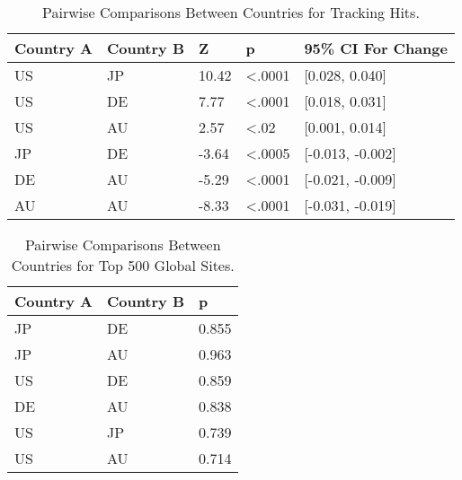 \documentclass[conference]{IEEEtran}
\begin{document}
\begin{table}[t]	
\centering
\caption{Pairwise Comparisons Between Countries for Tracking Hits.}
\label{pairwise}
\begin{tabular}{|l|l|l|l|l|}
   \hline
\textbf{Country A} & \textbf{Country B} & \textbf{Z}     & \textbf{p}              & 9\textbf{5\% CI For Change}   \\    \hline
US        & JP        & 10.42 & \textless.0001 & {[}0.028, 0.040{]}   \\   \hline
US        & DE        & 7.77  & \textless.0001 & {[}0.018, 0.031{]}   \\   \hline
US        & AU        & 2.57  & \textless.02   & {[}0.001, 0.014{]}   \\   \hline
JP        & DE        & -3.64 & \textless.0005 & {[}-0.013, -0.002{]} \\   \hline
DE        & AU        & -5.29 & \textless.0001 & {[}-0.021, -0.009{]} \\   \hline
AU        & AU        & -8.33 & \textless.0001 & {[}-0.031, -0.019{]}\\   \hline
\end{tabular}
\end{table}

\begin{table}[t]
\centering
\caption{Pairwise Comparisons Between Countries for Top 500 Global Sites.}
\label{pairwise500}
\begin{tabular}{|l|l|l|}
\hline
\textbf{Country A} & \textbf{Country B}  & \textbf{p} \\ \hline
JP                            & DE                            & 0.855                         \\ \hline
JP                            & AU                            & 0.963\\ \hline
US                            & DE                            & 0.859                         \\ \hline
DE                            & AU                            & 0.838                         \\ \hline
US                            & JP                            & 0.739                         \\ \hline
US                            & AU                            & 0.714                         \\ \hline        
\end{tabular}
\end{table}
\end{document}
